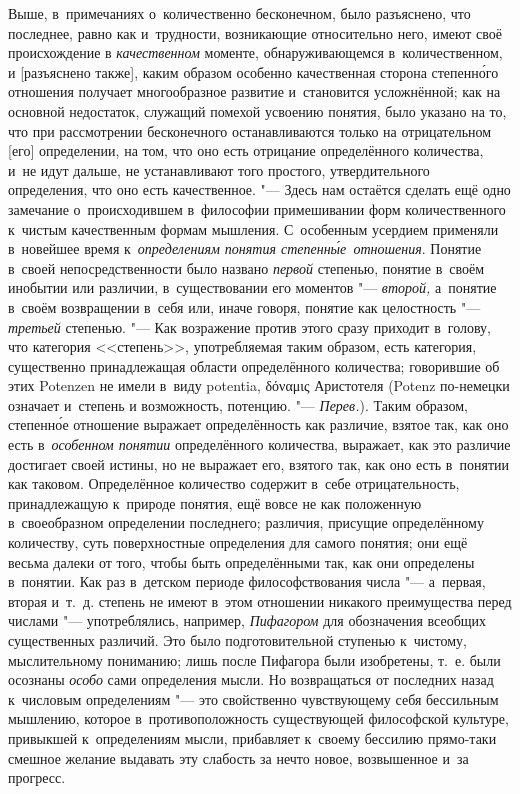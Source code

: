 Выше, в~примечаниях о~количественно бесконечном, было разъяснено, что
последнее, равно как и~трудности, возникающие относительно него, имеют своё
происхождение в {\em качественном} моменте, обнаруживающемся в~количественном,
и [разъяснено также], каким образом особенно качественная сторона
степенн\'{о}го отношения получает многообразное развитие и~становится
усложнённой; как на основной недостаток, служащий
помехой усвоению понятия, было указано на то, что при рассмотрении бесконечного
останавливаются только на отрицательном [его] определении, на том, что оно есть
отрицание определённого количества, и~не идут дальше, не устанавливают того
простого, утвердительного определения, что оно есть качественное. "--- Здесь
нам остаётся сделать ещё одно замечание о~происходившем в~философии
примешивании форм количественного к~чистым качественным формам мышления.
С~особенным усердием применяли в~новейшее время
к~{\em определениям понятия степенн\'{ы}е~отношения}. Понятие в~своей непосредственности было названо
{\em первой} степенью, понятие в~своём инобытии или различии, в~существовании
его моментов "--- {\em второй,} а~понятие в~своём возвращении в~себя или, иначе
говоря, понятие как целостность "--- {\em третьей} степенью. "--- Как
возражение против этого сразу приходит в~голову, что категория <<степень>>,
употребляемая таким образом, есть категория, существенно принадлежащая области
определённого количества; говорившие об этих Potenzen не имели в~виду potentia,
\textgreek{δόναμις} Аристотеля (Potenz по-немецки означает и~степень и
возможность, потенцию. "--- {\em Перев.}). Таким образом, степенн\'{о}е
отношение выражает определённость как различие, взятое так, как оно есть
в~{\em особенном понятии} определённого количества, выражает, как это различие
достигает своей истины, но не выражает его, взятого так, как оно есть в~понятии
как таковом. Определённое количество содержит в~себе отрицательность,
принадлежащую к~природе понятия, ещё вовсе не как положенную в~своеобразном
определении последнего; различия, присущие определённому количеству, суть
поверхностные определения для самого понятия; они ещё весьма далеки от того,
чтобы быть определёнными так, как они определены в~понятии. Как раз в~детском
периоде философствования числа "--- а~первая, вторая и~т.~д. степень не имеют
в~этом отношении никакого преимущества перед числами "--- употреблялись,
например, {\em Пифагором} для обозначения всеобщих существенных различий. Это
было подготовительной ступенью к~чистому, мыслительному пониманию; лишь после
Пифагора были изобретены, т.~е. были осознаны {\em особо} сами определения
мысли. Но возвращаться от последних назад к~числовым определениям "--- это
свойственно чувствующему себя бессильным мышлению, которое в~противоположность
существующей философской культуре, привыкшей к~определениям мысли, прибавляет
к~своему бессилию прямо-таки смешное желание выдавать эту слабость за нечто
новое, возвышенное и~за прогресс.

